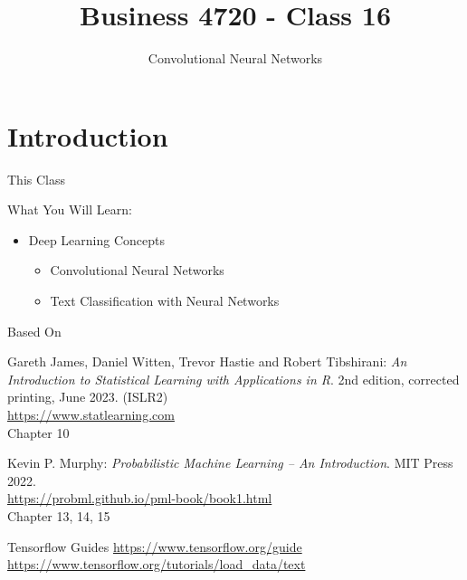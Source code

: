 \documentclass[ignorenonframetext,xcolor=x11names]{beamer}
\title{Business 4720 - Class 16}
\subtitle{Convolutional Neural Networks}
\begin{document}
\begin{frame}[label=full]{}
  \titlepage
  \footnotesize
  
\end{frame}

\section{Introduction}

\begin{frame}[label=full]{This Class}

\begin{block}{What You Will Learn:}
\begin{itemize}
  \item Deep Learning Concepts
  \begin{itemize}
     \item Convolutional Neural Networks
     \item Text Classification with Neural Networks
  \end{itemize}
\end{itemize}
\end{block}
\end{frame}

\begin{frame}[label=full]{Based On}
\small
\begin{block}{}
Gareth James, Daniel Witten, Trevor Hastie and Robert Tibshirani: \emph{An Introduction to Statistical Learning with Applications in R}. 2nd edition, corrected printing, June 2023. (ISLR2) \\
\vspace{1mm}
\url{https://www.statlearning.com} \\
\vspace{1mm}
Chapter 10
\end{block}

\begin{block}{}
Kevin P. Murphy: \emph{Probabilistic Machine Learning -- An Introduction}. MIT Press 2022. \\
\vspace{1mm}
\url{https://probml.github.io/pml-book/book1.html} \\
\vspace{1mm}
Chapter 13, 14, 15
\end{block}

\begin{block}{Tensorflow Guides}
\url{https://www.tensorflow.org/guide} \\
\url{https://www.tensorflow.org/tutorials/load_data/text}
\end{block}
\end{frame}
\end{document}
